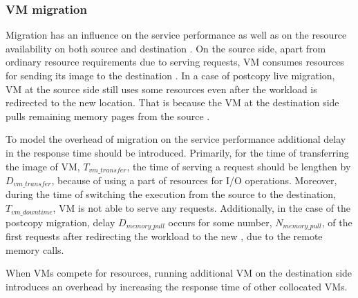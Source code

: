 \subsubsection{VM migration}
Migration has an influence on the service performance as well as on the resource availability on both source and destination \dc{}.
On the source side, apart from ordinary resource requirements due to serving requests, VM consumes resources for sending its image to the destination \dc{}.
In a case of postcopy live migration, VM at the source side still uses some resources even after the workload is redirected to the new location.
That is because the VM at the destination side pulls remaining memory pages from the source \dc{}.


To model the overhead of migration on the service performance additional delay in the response time should be introduced.
Primarily, for the time of transferring the image of VM, $T_{vm\_transfer}$, the time of serving a request should be lengthen by $D_{vm\_transfer}$, because of using a part of resources for I/O operations.
Moreover, during the time of switching the execution from the source to the destination, $T_{vm\_downtime}$, VM is not able to serve any requests.
Additionally, in the case of the postcopy migration, delay  $D_{memory\_pull}$ occurs for some number, $N_{memory\_pull}$, of the first requests after redirecting the workload to the new \dc{}, due to the remote memory calls.

When VMs compete for resources, running additional VM on the destination side introduces an overhead by increasing the response time of other collocated VMs.